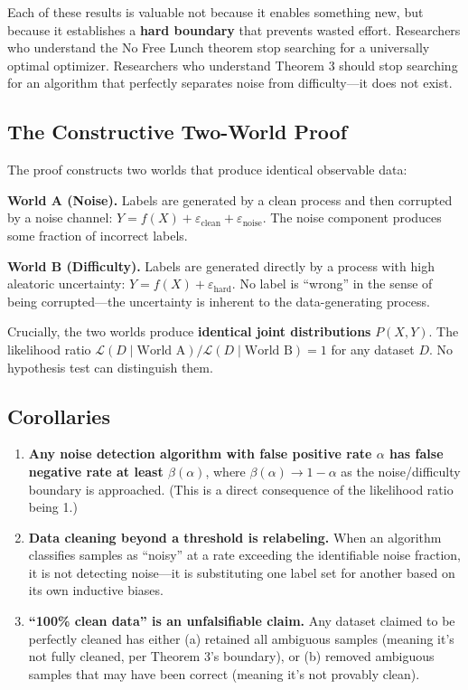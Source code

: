 \documentclass[12pt,a4paper]{ctexart}
\begin{document}
Each of these results is valuable not because it enables something new, but because it establishes a \textbf{hard boundary} that prevents wasted effort. Researchers who understand the No Free Lunch theorem stop searching for a universally optimal optimizer. Researchers who understand Theorem 3 should stop searching for an algorithm that perfectly separates noise from difficulty—it does not exist.

\subsection{The Constructive Two-World Proof}

The proof constructs two worlds that produce identical observable data:

\textbf{World A (Noise).} Labels are generated by a clean process and then corrupted by a noise channel: $Y = f(X) + \varepsilon_{\text{clean}} + \varepsilon_{\text{noise}}$. The noise component produces some fraction of incorrect labels.

\textbf{World B (Difficulty).} Labels are generated directly by a process with high aleatoric uncertainty: $Y = f(X) + \varepsilon_{\text{hard}}$. No label is ``wrong'' in the sense of being corrupted—the uncertainty is inherent to the data-generating process.

Crucially, the two worlds produce \textbf{identical joint distributions} $P(X, Y)$. The likelihood ratio $\mathcal{L}(D \mid \text{World A}) / \mathcal{L}(D \mid \text{World B}) = 1$ for any dataset $D$. No hypothesis test can distinguish them.

\subsection{Corollaries}

\begin{enumerate}
\item \textbf{Any noise detection algorithm with false positive rate $\alpha$ has false negative rate at least $\beta(\alpha)$}, where $\beta(\alpha) \to 1 - \alpha$ as the noise/difficulty boundary is approached. (This is a direct consequence of the likelihood ratio being 1.)

\item \textbf{Data cleaning beyond a threshold is relabeling.} When an algorithm classifies samples as ``noisy'' at a rate exceeding the identifiable noise fraction, it is not detecting noise—it is substituting one label set for another based on its own inductive biases.

\item \textbf{``100\% clean data'' is an unfalsifiable claim.} Any dataset claimed to be perfectly cleaned has either (a) retained all ambiguous samples (meaning it's not fully cleaned, per Theorem 3's boundary), or (b) removed ambiguous samples that may have been correct (meaning it's not provably clean).
\end{enumerate}
\end{document}
